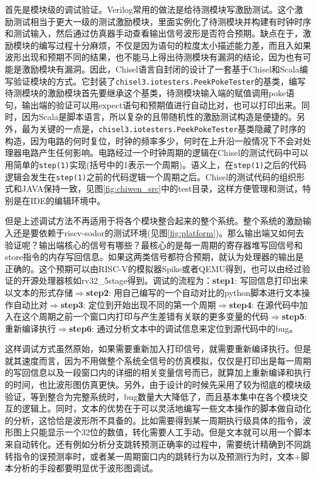 首先是模块级的调试验证。Verilog常用的做法是给待测模块写激励测试。这个激励测试相当于更大一级的测试激励模块，里面实例化了待测模块并构建有时钟时序和测试输入，然后通过仿真器手动查看输出信号波形是否符合预期。缺点在于，激励模块的编写过程十分麻烦，不仅是因为语句的粒度太小描述能力差，而且入如果波形出现和预期不同的结果，也不能马上得出待测模块有漏洞的结论，因为也有可能是激励模块有漏洞。因此，Chisel语言自封闭的设计了一套基于Chisel和Scala编写验证模块的方式。它封装了\texttt{\footnotesize{chisel3.iotesters.PeekPokeTester}}的基类，编写待测模块的激励模块首先要继承这个基类，待测模块输入端的赋值调用poke语句，输出端的验证可以用expect语句和预期值进行自动比对，也可以打印出来。同时，因为Scala是脚本语言，所以复杂的且带随机性的激励测试构造是便捷的。另外，最为关键的一点是，\texttt{\footnotesize{chisel3.iotesters.PeekPokeTester}}基类隐藏了时序的构造，因为电路的何时复位，时钟的频率多少，何时在上升沿一般情况下不会对处理器电路产生任何影响。电路经过一个时钟周期的逻辑在Chisel的测试代码中可以用简单的\texttt{step(1)}实现(括号中的1表示一个周期)。语义上，在\texttt{step(1)}之后的代码逻辑会发生在\texttt{step(1)}之前的代码逻辑一个周期之后。Chisel的测试代码的组织形式和JAVA保持一致，见图\ref{fig:chiwen_src}中的test目录，这样方便管理和测试，特别是在IDE的编辑环境中。

但是上述调试方法不再适用于将各个模块整合起来的整个系统。整个系统的激励输入还是要依赖于riscv-sodor的测试环境(见图\ref{fig:platform})。那么输出端又如何去验证呢？输出端核心的信号有哪些？最核心的是每一周期的寄存器堆写回信号和store指令的内存写回信息。如果这两类信号都符合预期，就认为处理器的输出是正确的。这个预期可以由RISC-V的模拟器Spike或者QEMU得到，也可以由经过验证的开源处理器核如rv32\_5stage得到。调试的流程为：\textbf{step1}: 写回信息打印出来以文本的形式存储$ \Rightarrow $\textbf{step2}: 用自己编写的一个自动对比的python脚本进行文本操作自动比对$ \Rightarrow $\textbf{step3}: 定位到开始出现不同的第一个周期$ \Rightarrow $\textbf{step4}: 在源代码中加入在这个周期之前一个窗口内打印与产生差错有关联的更多变量的代码$ \Rightarrow $\textbf{step5}: 重新编译执行$ \Rightarrow $\textbf{step6}: 通过分析文本中的调试信息来定位到源代码中的bug。

这样调试方式虽然原始，如果需要重新加入打印信号，就需要重新编译执行。但是就其速度而言，因为不用做整个系统全信号的仿真模拟，仅仅是打印出是每一周期的写回信息以及一段窗口内的详细的相关变量信号而已，就算加上重新编译和执行的时间，也比波形图仿真更快。另外，由于设计的时候先采用了较为彻底的模块级验证，等到整合为完整系统时，bug数量大大降低了，而且基本集中在各个模块交互的逻辑上。同时，文本的优势在于可以灵活地编写一些文本操作的脚本做自动化的分析，这恰恰是波形所不具备的。比如需要得到某一周期执行级具体的指令，波形图上只能显示一个32位的数值，转化需要人工手动。但是文本就可以用一个脚本来自动转化。还有例如分析分支跳转预测正确率的过程中，需要统计精确到不同跳转指令的误预测率时，或者某一周期窗口内的跳转行为以及预测行为时，文本+脚本分析的手段都要明显优于波形图调试。

